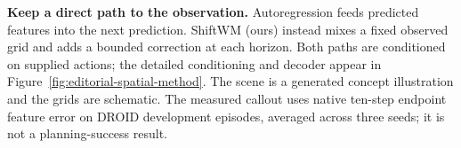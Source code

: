 \textbf{Keep a direct path to the observation.} Autoregression feeds predicted features into the next prediction. ShiftWM (ours) instead mixes a fixed observed grid and adds a bounded correction at each horizon. Both paths are conditioned on supplied actions; the detailed conditioning and decoder appear in Figure~\ref{fig:editorial-spatial-method}. The scene is a generated concept illustration and the grids are schematic. The measured callout uses native ten-step endpoint feature error on DROID development episodes, averaged across three seeds; it is not a planning-success result.
